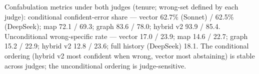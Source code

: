 Confabulation metrics under both judges (tenure; wrong-set defined by each
judge): conditional confident-error share --- vector 62.7\% (Sonnet) /
62.5\% (DeepSeek); map 72.1 / 69.3; graph 83.6 / 78.0; hybrid v2 93.9 /
85.4. Unconditional wrong-specific rate --- vector 17.0 / 23.9; map 14.6 /
22.7; graph 15.2 / 22.9; hybrid v2 12.8 / 23.6; full history (DeepSeek)
18.1. The conditional ordering (hybrid v2 most confident when wrong,
vector most abstaining) is stable across judges; the unconditional
ordering is judge-sensitive.
